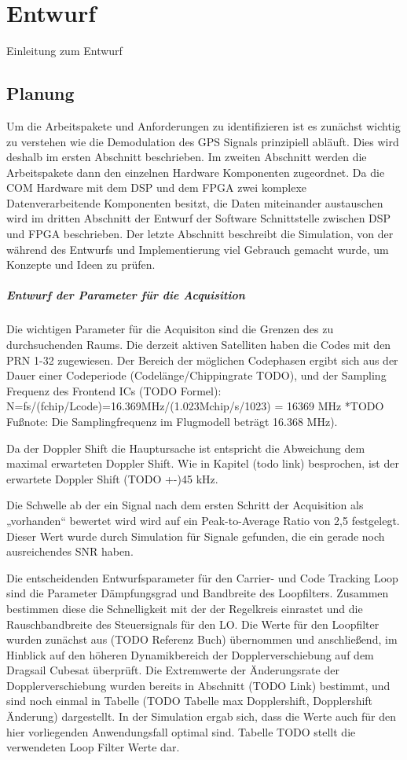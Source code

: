 \chapter{Entwurf}
Einleitung zum Entwurf

\section{Planung}
Um die Arbeitspakete und Anforderungen zu identifizieren ist es zunächst wichtig zu verstehen wie die Demodulation des GPS Signals prinzipiell abläuft. Dies wird deshalb im ersten Abschnitt beschrieben. Im zweiten Abschnitt werden die Arbeitspakete dann den einzelnen Hardware Komponenten zugeordnet. Da die COM Hardware mit dem DSP und dem FPGA zwei komplexe Datenverarbeitende Komponenten besitzt, die Daten miteinander austauschen wird im dritten Abschnitt der Entwurf der Software Schnittstelle zwischen DSP und FPGA beschrieben. Der letzte Abschnitt beschreibt die Simulation, von der während des Entwurfs und Implementierung viel Gebrauch gemacht wurde, um Konzepte und Ideen zu prüfen.

\paragraph{Entwurf der Parameter für die Acquisition}
Die wichtigen Parameter für die Acquisiton sind die Grenzen des zu durchsuchenden Raums.
Die derzeit aktiven Satelliten haben die Codes mit den PRN 1-32 zugewiesen. Der Bereich der möglichen Codephasen ergibt sich aus der Dauer einer Codeperiode (Codelänge/Chippingrate TODO), und der Sampling Frequenz des Frontend ICs (TODO Formel): N=fs/(fchip/Lcode)=16.369MHz/(1.023Mchip/s/1023) = 16369 MHz *TODO Fußnote: Die Samplingfrequenz im Flugmodell beträgt 16.368 MHz).

Da der Doppler Shift die Hauptursache ist entspricht die Abweichung dem maximal erwarteten Doppler Shift. Wie in Kapitel (todo link) besprochen, ist der erwartete Doppler Shift (TODO +-)45 kHz.

Die Schwelle ab der ein Signal nach dem ersten Schritt der Acquisition als „vorhanden“ bewertet wird wird auf ein Peak-to-Average Ratio von 2,5 festgelegt. Dieser Wert wurde durch Simulation für Signale gefunden, die ein gerade noch ausreichendes SNR haben.




Die entscheidenden Entwurfsparameter für den Carrier- und Code Tracking Loop sind die Parameter Dämpfungsgrad und Bandbreite des Loopfilters. Zusammen bestimmen diese die Schnelligkeit mit der der Regelkreis einrastet und die Rauschbandbreite des Steuersignals für den LO.
Die Werte für den Loopfilter wurden zunächst aus (TODO Referenz Buch) übernommen und anschließend, im Hinblick auf den höheren Dynamikbereich der Dopplerverschiebung auf dem Dragsail Cubesat überprüft. Die Extremwerte der Änderungsrate der Dopplerverschiebung wurden bereits in Abschnitt (TODO Link) bestimmt, und sind noch einmal in Tabelle (TODO Tabelle max Dopplershift, Dopplershift Änderung) dargestellt.
In der Simulation ergab sich, dass die Werte auch für den hier vorliegenden Anwendungsfall optimal sind. Tabelle TODO stellt die verwendeten Loop Filter Werte dar.

